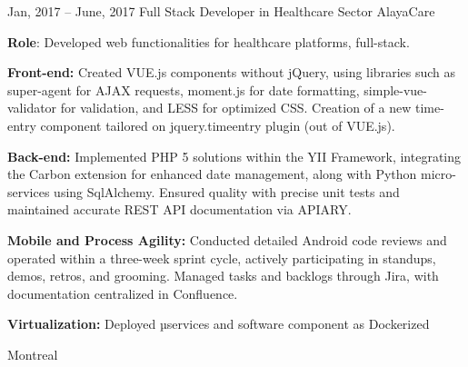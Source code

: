 \documentclass[
  a4paper,
   maincolor=cvblue,
   sectioncolor=cvblue,
   sidebarwidth=0.323\paperwidth,
]{fortysecondscv}
\begin{document}
\newpage
\makebacksidebar



\begin{cvtableNew}
  \cvitemRightNew
    {Jan, 2017 – June, 2017} %
    {Full Stack Developer in Healthcare Sector} %
    {AlayaCare} %
    {
      \vspace{0.1pt} %
      \fontsize{10.8pt}{12pt}\selectfont %
      \textbf{Role}: Developed web functionalities for healthcare platforms, full-stack.\par
      \vspace{4pt}
      \textbf{Front-end:} Created VUE.js components without jQuery, using libraries such as super-agent for AJAX requests, moment.js for date formatting, simple-vue-validator for validation, and LESS for optimized CSS. Creation of a new time-entry component tailored on jquery.timeentry plugin (out of VUE.js).\par
      \vspace{4pt}
      \textbf{Back-end:} Implemented PHP 5 solutions within the YII Framework, integrating the Carbon extension for enhanced date management, along with Python micro-services using SqlAlchemy. Ensured quality with precise unit tests and maintained accurate REST API documentation via APIARY.\par
      \vspace{4pt}
      \textbf{Mobile and Process Agility:} Conducted detailed Android code reviews and operated within a three-week sprint cycle, actively participating in standups, demos, retros, and grooming. Managed tasks and backlogs through Jira, with documentation centralized in Confluence.\par
      \vspace{4pt}
      \textbf{Virtualization:} Deployed µservices and software component as Dockerized\par
    }
    {Montreal} %

\vspace{2.2mm} %


\end{cvtableNew}
\end{document}
